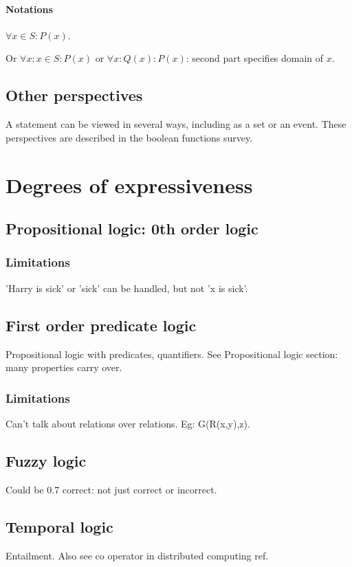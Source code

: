 \documentclass[oneside, article]{memoir}
\begin{document}
\subsubsection{Notations}
$\forall x \in S: P(x)$.

Or $\forall x: x \in S: P(x)$ or $\forall x: Q(x): P(x)$: second part specifies domain of $x$.

\section{Other perspectives}
A statement can be viewed in several ways, including as a set or an event. These perspectives are described in the boolean functions survey.

\chapter{Degrees of expressiveness}
\section{Propositional logic: 0th order logic}
\subsection{Limitations}
'Harry is sick' or 'sick' can be handled, but not 'x is sick'.

\section{First order predicate logic}
Propositional logic with predicates, quantifiers. See Propositional logic section: many properties carry over.


\subsection{Limitations}
Can't talk about relations over relations. Eg: G(R(x,y),z).

\section{Fuzzy logic}
Could be 0.7 correct: not just correct or incorrect.

\section{Temporal logic}
Entailment. Also see co operator in distributed computing ref.
\end{document}
